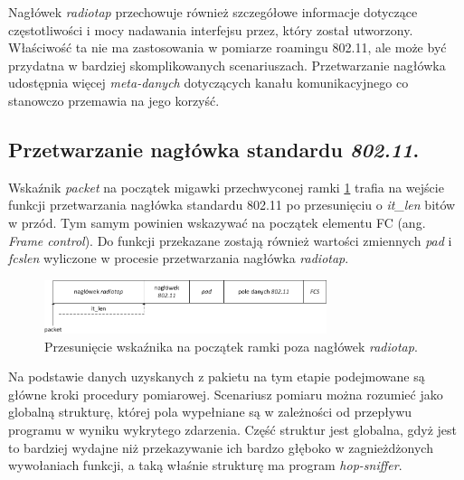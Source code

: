 Nagłówek \emph{radiotap} przechowuje również szczegółowe informacje dotyczące częstotliwości i mocy nadawania interfejsu przez, który został utworzony. Właściwość ta nie ma zastosowania w pomiarze roamingu 802.11, ale może być przydatna w bardziej skomplikowanych scenariuszach. Przetwarzanie nagłówka udostępnia więcej \emph{meta-danych} dotyczących kanału komunikacyjnego co stanowczo przemawia na jego korzyść. 

\subsection{Przetwarzanie nagłówka standardu \emph{802.11}.}

Wskaźnik \emph{packet} na początek migawki przechwyconej ramki \ref{RadiotapWifi} trafia na wejście funkcji przetwarzania nagłówka standardu 802.11 po przesunięciu o \emph{it\_len} bitów w przód. Tym samym powinien wskazywać na początek elementu FC (ang. \emph{Frame control}). Do funkcji przekazane zostają również wartości zmiennych \emph{pad} i \emph{fcslen} wyliczone w procesie przetwarzania nagłówka \emph{radiotap}. 

\begin{figure}[htb]
\begin{center}
\includegraphics[width=312px]{img/RadiotapWifi}
\caption{Przesunięcie wskaźnika na początek ramki poza nagłówek \emph{radiotap}.}
\label{RadiotapWifi}
\end{center}
\end{figure}

Na podstawie danych uzyskanych z pakietu na tym etapie podejmowane są główne kroki procedury pomiarowej. Scenariusz pomiaru można rozumieć jako globalną strukturę, której pola wypełniane są w zależności od przepływu programu w wyniku wykrytego zdarzenia. Część struktur jest globalna, gdyż jest to bardziej wydajne niż przekazywanie ich bardzo głęboko w zagnieżdżonych wywołaniach funkcji, a taką właśnie strukturę ma program \emph{hop-sniffer}. 

